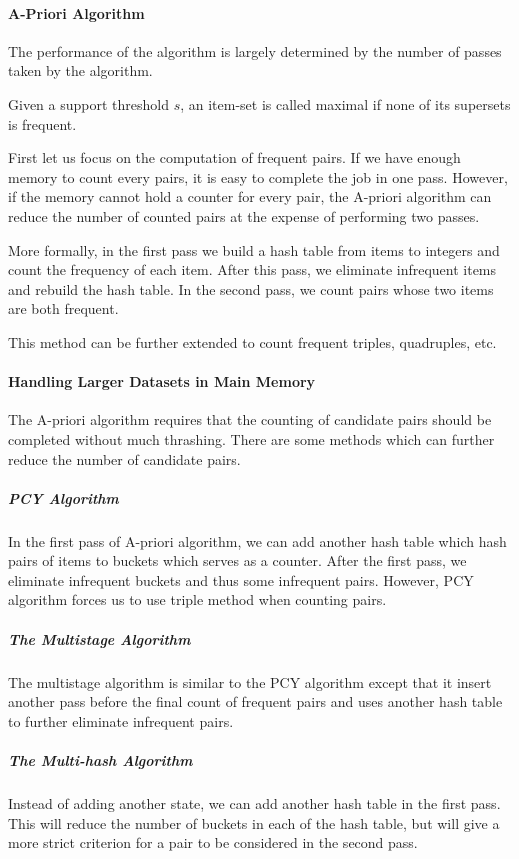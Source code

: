 \documentclass{article}
\begin{document}
\paragraph{A-Priori Algorithm}
The performance of the algorithm is largely determined by the number of passes taken by the algorithm.

Given a support threshold $s$, an item-set is called maximal if none of its supersets is frequent.

First let us focus on the computation of frequent pairs. If we have enough memory to count every pairs, it is easy to complete the job in one pass. However, if the memory cannot hold a counter for every pair, the A-priori algorithm can reduce the number of counted pairs at the expense of performing two passes.

More formally, in the first pass we build a hash table from items to integers and count the frequency of each item. After this pass, we eliminate infrequent items and rebuild the hash table. In the second pass, we count pairs whose two items are both frequent.

This method can be further extended to count frequent triples, quadruples, etc.

\paragraph{Handling Larger Datasets in Main Memory}
The A-priori algorithm requires that the counting of candidate pairs should be completed without much thrashing. There are some methods which can further reduce the number of candidate pairs.
\subparagraph{PCY Algorithm} In the first pass of A-priori algorithm, we can add another hash table which hash pairs of items to buckets which serves as a counter. After the first pass, we eliminate infrequent buckets and thus some infrequent pairs. However, PCY algorithm forces us to use triple method when counting pairs.

\subparagraph{The Multistage Algorithm} The multistage algorithm is similar to the PCY algorithm except that it insert another pass before the final count of frequent pairs and uses another hash table to further eliminate infrequent pairs.

\subparagraph{The Multi-hash Algorithm} Instead of adding another state, we can add another hash table in the first pass. This will reduce the number of buckets in each of the hash table, but will give a more strict criterion for a pair to be considered in the second pass.
\end{document}
